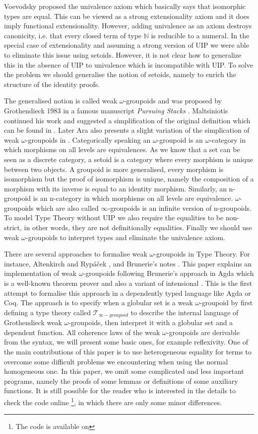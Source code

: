 \documentclass{acm_proc_article-sp}
\newcommand{\og}{$\omega$-groupoids}
\newcommand{\wog}{weak $\omega$-groupoids}
\newcommand{\wogs}{weak $\omega$-groupoid} %
\newcommand{\tig}{$\mathcal{T}_{\infty-groupoid}$}
\begin{document}
Voevodsky proposed the univalence axiom which basically says that
isomorphic types are equal. This can be viewed as a strong
extensionality axiom and it does imply functional extensionality.
However, adding
univalence as an axiom destroys canonicity, i.e. that every closed
term of type $\mathbb{N}$ is reducible to a numeral. In the special case of
extensionality and assuming a strong version of UIP we were able to
eliminate this issue \cite{alti:lics99,alti:ott-conf} using
setoids. However, it is not clear how to generalize this in the
absence of UIP to
univalence which is incompatible with UIP.  To solve the problem we
should generalise the notion of setoids, namely to enrich the
structure of the identity proofs.


The generalised notion is called {\wog} and was proposed by
Grothendieck 1983 in a famous manuscript \emph{Pursuing Stacks} \cite{gro:ps}. Maltsiniotis continued his work and suggested a simplification of the original definition which can be found in \cite{mal:gwog}. Later Ara also presents a slight variation of the simplication of {\wog} in \cite{ara:wog}. Categorically speaking an $\omega$-groupoid is an $\omega$-category in which morphisms on all levels are equivalences. As we know that a set can be seen as a discrete
category, a setoid is a category where every morphism is unique between
two objects. A groupoid is more generalised, every morphism is
isomorphism but the proof of isomorphism is unique, namely the composition of a morphism with its inverse is equal to an identity morphism. Similarly, an
n-groupoid is an n-category in which morphisms on all levels are
equivalence. {\og} which are also called $\infty$-groupoids is an
infinite version of n-groupoids. To model Type Theory without UIP we
also require the equalities to be non-strict, in other words, they are
not definitionally equalities. Finally we should use {\wog} to interpret types and eliminate the univalence axiom.

There are several approaches to formalise {\wog} in Type Theory. For instance, Altenkirch and Ryp\'a\v{c}ek \cite{txa:csl}, and Brunerie's notes \cite{gb:wog}.
This paper explains an implementation of {\wog} following Brunerie's approach in Agda which is a well-known theorem prover and also a variant of intensional {\mltt}. This is the first attempt to formalise this approach in a dependently typed language like Agda or Coq. The approach is to specify when a globular set is a {\wogs} by first defining a type theory called {\tig} to describe the internal language
of Grothendieck {\wog}, then interpret it with a globular set and a dependent function. All coherence laws of the {\wog} are derivable from the syntax, we will present some basic ones, for example reflexivity. One of the main contributions of this paper is to use heterogeneous equality for terms to overcome some difficult problems we encountering when using the normal homogeneous one. In this paper, we omit some complicated and less important programs, namely the proofs of some lemmas or definitions of some auxiliary functions. It is still possible for the reader who is interested in the details to check the code online \footnote{The code is available on }, in which there are only some minor differences.
\end{document}
